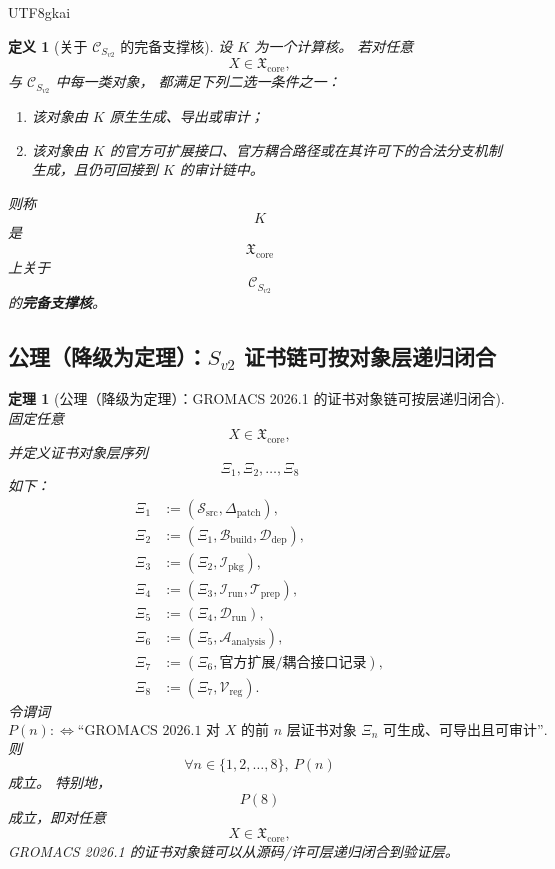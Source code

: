 \documentclass[12pt]{article}
\newtheorem{definition}{定义}[section]
\newtheorem{theorem}{定理}[section]
\begin{document}
\begin{CJK*}{UTF8}{gkai}
\begin{definition}[关于 \texorpdfstring{$\mathcal C_{S_{v2}}$}{C\_S-v2} 的完备支撑核]
\label{def:tex39-complete-kernel}
设 $K$ 为一个计算核。
若对任意
\[
  X\in\mathfrak X_{\mathrm{core}},
\]
与 $\mathcal C_{S_{v2}}$ 中每一类对象，
都满足下列二选一条件之一：
\begin{enumerate}
  \item 该对象由 $K$ 原生生成、导出或审计；
  \item 该对象由 $K$ 的官方可扩展接口、官方耦合路径或在其许可下的合法分支机制生成，且仍可回接到 $K$ 的审计链中。
\end{enumerate}
则称
\[
  K
\]
是
\[
  \mathfrak X_{\mathrm{core}}
\]
上关于
\[
  \mathcal C_{S_{v2}}
\]
的\textbf{完备支撑核}。
\end{definition}

\subsection{公理（降级为定理）：\texorpdfstring{$S_{v2}$}{S-v2} 证书链可按对象层递归闭合}
\label{subsec:tex39-ch2-axiom}

\begin{theorem}[公理（降级为定理）：GROMACS 2026.1 的证书对象链可按层递归闭合]
\label{thm:tex39-cert-chain}
固定任意
\[
  X\in \mathfrak X_{\mathrm{core}},
\]
并定义证书对象层序列
\[
  \Xi_1,\Xi_2,\dots,\Xi_8
\]
如下：
\[
\begin{aligned}
  \Xi_1 &:= (\mathcal S_{\mathrm{src}},\Delta_{\mathrm{patch}}),\\
  \Xi_2 &:= (\Xi_1,\mathcal B_{\mathrm{build}},\mathcal D_{\mathrm{dep}}),\\
  \Xi_3 &:= (\Xi_2,\mathcal I_{\mathrm{pkg}}),\\
  \Xi_4 &:= (\Xi_3,\mathcal I_{\mathrm{run}},\mathcal T_{\mathrm{prep}}),\\
  \Xi_5 &:= (\Xi_4,\mathcal D_{\mathrm{run}}),\\
  \Xi_6 &:= (\Xi_5,\mathcal A_{\mathrm{analysis}}),\\
  \Xi_7 &:= (\Xi_6,\text{官方扩展/耦合接口记录}),\\
  \Xi_8 &:= (\Xi_7,\mathcal V_{\mathrm{reg}}).
\end{aligned}
\]
令谓词
\[
  P(n)
  :
  \Longleftrightarrow
  \text{“GROMACS 2026.1 对 }X\text{ 的前 }n\text{ 层证书对象 } \Xi_n \text{ 可生成、可导出且可审计”}.
\]
则
\[
  \forall n\in\{1,2,\dots,8\},\ P(n)
\]
成立。
特别地，
\[
  P(8)
\]
成立，即对任意
\[
  X\in\mathfrak X_{\mathrm{core}},
\]
GROMACS 2026.1 的证书对象链可以从源码/许可层递归闭合到验证层。
\end{theorem}


\end{CJK*}
\end{document}
